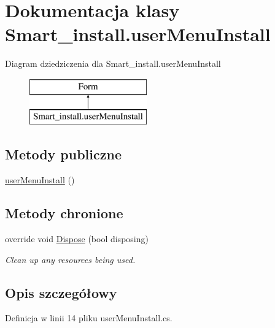 \hypertarget{class_smart__install_1_1user_menu_install}{\section{Dokumentacja klasy Smart\+\_\+install.\+user\+Menu\+Install}
\label{class_smart__install_1_1user_menu_install}
}
Diagram dziedziczenia dla Smart\+\_\+install.\+user\+Menu\+Install\begin{figure}[H]
\begin{center}
\leavevmode
\includegraphics[height=2.000000cm]{class_smart__install_1_1user_menu_install}
\end{center}
\end{figure}
\subsection*{Metody publiczne}
\begin{DoxyCompactItemize}
\item 
\hyperlink{class_smart__install_1_1user_menu_install_a102223575d41f3e6c66438621e911678}{user\+Menu\+Install} ()
\end{DoxyCompactItemize}
\subsection*{Metody chronione}
\begin{DoxyCompactItemize}
\item 
override void \hyperlink{class_smart__install_1_1user_menu_install_ab9c936c4dba89e7311daa746dfcece7f}{Dispose} (bool disposing)
\begin{DoxyCompactList}\small\item\em Clean up any resources being used. \end{DoxyCompactList}\end{DoxyCompactItemize}


\subsection{Opis szczegółowy}


Definicja w linii 14 pliku user\+Menu\+Install.\+cs.



